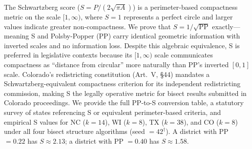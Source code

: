 The Schwartzberg score ($S = P / (2\sqrt{\pi A})$) is a perimeter-based
compactness metric on the scale $[1, \infty)$, where $S = 1$ represents a
perfect circle and larger values indicate greater non-compactness.
We prove that $S = 1/\sqrt{\text{PP}}$ exactly---meaning S and Polsby-Popper (PP)
carry identical geometric information with inverted scales and no information loss.
Despite this algebraic equivalence, S is preferred in legislative contexts
because its $[1, \infty)$ scale communicates compactness as ``distance from
circular'' more naturally than PP's inverted $[0,1]$ scale.
Colorado's redistricting constitution (Art.\ V, \S 44) mandates a
Schwartzberg-equivalent compactness criterion for its independent redistricting
commission, making S the legally operative metric for bisect results
submitted in Colorado proceedings.
We provide the full PP-to-S conversion table, a statutory survey of states
referencing S or equivalent perimeter-based criteria, and empirical S values
for NC ($k=14$), WI ($k=8$), TX ($k=38$), and CO ($k=8$) under all four
bisect structure algorithms (seed $= 42^\dagger$).
A district with PP $= 0.22$ has $S \approx 2.13$;
a district with PP $= 0.40$ has $S \approx 1.58$.
